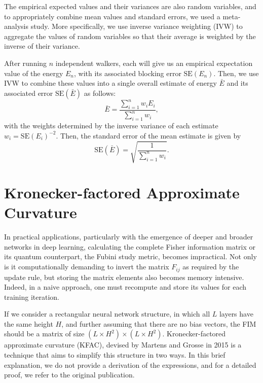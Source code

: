 The empirical expected values and their variances are also random variables, and to appropriately combine mean values and standard errors, we used a meta-analysis study. More specifically, we use inverse variance weighting (IVW) \cite{borenstein2021introduction} to aggregate the values of random variables so that their average is weighted by the inverse of their variance.

After running $n$ independent walkers, each will give us an empirical expectation value of the energy $E_n$, with its associated blocking error $\text{SE}(E_n)$. Then, we use IVW to combine these values into a single overall estimate of energy $\bar{E}$ and its associated error $\text{SE}(\bar{E})$ as follows:
\begin{equation*}
\bar{E} = \frac{\sum_{i=1}^n w_i E_i}{\sum_{i=1}^n w_i},
\end{equation*}
with the weights determined by the inverse variance of each estimate $w_i = \text{SE}(E_i)^{-2}$. Then, the standard error of the mean estimate is given by
\begin{equation*}
\text{SE}(\bar{E}) = \sqrt{\frac{1}{\sum_{i=1}^n w_i}}.
\end{equation*}

\section{Kronecker-factored Approximate Curvature}\label{sec:kfac}

In practical applications, particularly with the emergence of deeper and broader networks in deep learning, calculating the complete Fisher information matrix or its quantum counterpart, the Fubini study metric, becomes impractical. Not only is it computationally demanding to invert the matrix $F_{ij}$ as required by the update rule, but storing the matrix elements also becomes memory intensive. Indeed, in a naive approach, one must recompute and store its values for each training iteration. 

If we consider a rectangular neural network structure, in which all $L$ layers have the same height $H$, and further assuming that there are no bias vectors, the FIM should be a matrix of size $(L \times H^2) \times (L \times H^2)$. Kronecker-factored approximate curvature (KFAC), devised by Martens and Grosse in 2015 \cite{martens2015optimizing} is a technique that aims to simplify this structure in two ways. In this brief explanation, we do not provide a derivation of the expressions, and for a detailed proof, we refer to the original publication.

